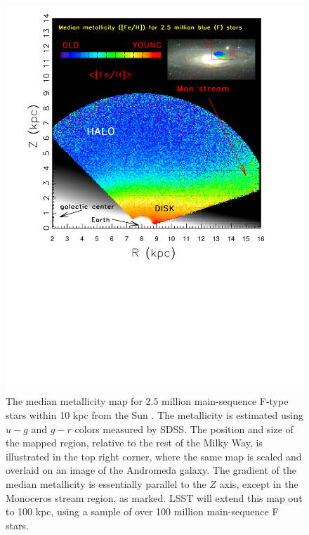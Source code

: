 \begin{figure}
\includegraphics[width=1.\hsize,clip]{panelsLSST}
\caption{
The median metallicity map for 2.5 million main-sequence F-type stars within 10 kpc
from the Sun \citep[adapted from][]{2008ApJ...684..287I}. The metallicity is estimated using
$u-g$ and $g-r$ colors measured by SDSS. The position and size of the mapped
region, relative to the rest of the Milky Way, is illustrated in the top right
corner, where the same map is scaled and overlaid on an image of the Andromeda
galaxy. The gradient of the median metallicity is essentially parallel
to the $Z$ axis, except in the Monoceros stream region, as marked. LSST
will extend this map out to 100 kpc, using a sample of over 100 million
main-sequence F stars.}
\label{Fig:FeH3}
\end{figure}


